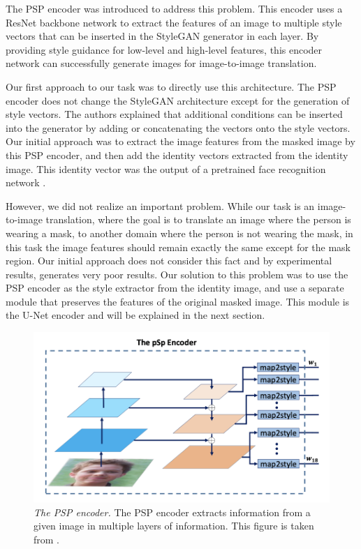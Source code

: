 \documentclass[sigconf,authorversion,nonacm]{acmart}
\begin{document}
The PSP encoder \cite{PSP} was introduced to address this problem. This encoder uses a ResNet backbone network to extract the features of an image to multiple style vectors that can be inserted in the StyleGAN generator in each layer.
By providing style guidance for low-level and high-level features, this encoder network can successfully generate images for image-to-image translation.

Our first approach to our task was to directly use this architecture. The PSP encoder does not change the StyleGAN architecture except for the generation of style vectors.
The authors explained that additional conditions can be inserted into the generator by adding or concatenating the vectors onto the style vectors. Our initial approach was to extract the image features from the masked image by this PSP encoder, and then add the identity vectors extracted from the identity image. This identity vector was the output of a pretrained face recognition network \cite{Arcface}.

However, we did not realize an important problem. While our task is an image-to-image translation, where the goal is to translate an image where the person is wearing a mask, to another domain where the person is not wearing the mask,
in this task the image features should remain exactly the same except for the mask region. Our initial approach does not consider this fact and by experimental results, generates very poor results.
Our solution to this problem was to use the PSP encoder as the style extractor from the identity image, and use a separate module that preserves the features of the original masked image. This module is the U-Net encoder and will be explained in the next section.

\begin{figure}[H]
  \centering
  \includegraphics[width=0.8\linewidth]{images/psp-encoder.png}
  \caption{\emph{The PSP encoder.} The PSP encoder extracts information from a given image in multiple layers of information. This figure is taken from \cite{PSP}.}
\end{figure}
\end{document}
